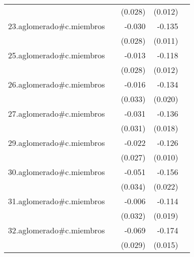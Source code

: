 {\begin{longtable}{l*{4}{D{.}{.}{-1}}}
            &                     &     (0.028)         &     (0.012)         &                     \\
\addlinespace
23.aglomerado#c.miembros&                     &      -0.030         &      -0.135\sym{***}&                     \\
            &                     &     (0.028)         &     (0.011)         &                     \\
\addlinespace
25.aglomerado#c.miembros&                     &      -0.013         &      -0.118\sym{***}&                     \\
            &                     &     (0.028)         &     (0.012)         &                     \\
\addlinespace
26.aglomerado#c.miembros&                     &      -0.016         &      -0.134\sym{***}&                     \\
            &                     &     (0.033)         &     (0.020)         &                     \\
\addlinespace
27.aglomerado#c.miembros&                     &      -0.031         &      -0.136\sym{***}&                     \\
            &                     &     (0.031)         &     (0.018)         &                     \\
\addlinespace
29.aglomerado#c.miembros&                     &      -0.022         &      -0.126\sym{***}&                     \\
            &                     &     (0.027)         &     (0.010)         &                     \\
\addlinespace
30.aglomerado#c.miembros&                     &      -0.051         &      -0.156\sym{***}&                     \\
            &                     &     (0.034)         &     (0.022)         &                     \\
\addlinespace
31.aglomerado#c.miembros&                     &      -0.006         &      -0.114\sym{***}&                     \\
            &                     &     (0.032)         &     (0.019)         &                     \\
\addlinespace
32.aglomerado#c.miembros&                     &      -0.069\sym{*}  &      -0.174\sym{***}&                     \\
            &                     &     (0.029)         &     (0.015)         &                     \\

\end{longtable}}
